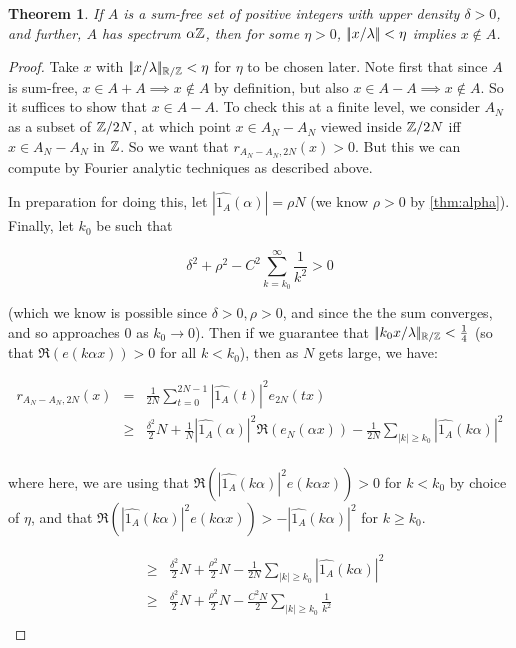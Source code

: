 \documentclass{article}
\newtheorem{theorem}{Theorem}[section]
\theoremstyle{definition}
\theoremstyle{remark}
\numberwithin{equation}{section}
\begin{document}
\begin{theorem}\label{thm:hole1}
  If $A$ is a sum-free set of positive integers with upper density
  $\delta > 0$, and further, $A$ has spectrum $\alpha\mathbb{Z}$, then for
  some $\eta > 0$, $|\!|x/\lambda|\!| < \eta$ implies $x \notin A$.
\end{theorem}

\begin{proof}
  Take $x$ with $|\!|x/\lambda|\!|_{\mathbb{R}/\mathbb{Z}} < \eta$ for $\eta$ to be chosen
  later.  Note first that since $A$ is sum-free,
  $x \in A+A \implies x \notin A$ by definition, but also
  $x \in A-A \implies x \notin A$.  So it suffices to show that
  $x \in A-A$.  To check this at a finite level, we consider $A_N$ as
  a subset of $\mathbb{Z}/2N$, at which point $x \in A_N - A_N$ viewed inside
  $\mathbb{Z}/2N$ iff $x \in A_N - A_N$ in $\mathbb{Z}$.  So we want that
  $r_{A_N-A_N,2N}(x) > 0$.  But this we can compute by Fourier
  analytic techniques as described above.

  In preparation for doing this, let
  $|\widehat{1_A}(\alpha)| = \rho N$ (we know $\rho > 0$ by
  \ref{thm:alpha}).  Finally, let $k_0$ be such that

  \[\delta^2 + \rho^2 - C^2 \sum_{k=k_0}^\infty \frac{1}{k^2} > 0\]

  (which we know is possible since $\delta > 0, \rho > 0$, and since
  the the sum converges, and so approaches 0 as $k_0 \to 0$).  Then if
  we guarantee that $|\!|k_0 x/\lambda|\!|_{\mathbb{R}/\mathbb{Z}} < \frac14$ (so that
  $\Re(e(k\alpha x)) > 0$ for all $k < k_0$), then as $N$ gets large, we
  have:

  \begin{eqnarray*}
    r_{A_N - A_N,2N}(x) &=& \frac{1}{2N} \sum_{t=0}^{2N-1} |\widehat{1_A}(t)|^2 e_{2N}(tx)\\
                        &\geq& \frac{\delta^2}{2} N + \frac{1}{N}
                               |\widehat{1_A}(\alpha)|^2
                               \Re(e_N(\alpha x)) - \frac{1}{2N} \sum_{|k| \geq k_0}
                               |\widehat{1_A}(k\alpha)|^2\\
  \end{eqnarray*}

  where here, we are using that
  $\Re(|\widehat{1_A}(k\alpha)|^2 e(k\alpha x)) > 0$ for $k < k_0$ by
  choice of $\eta$, and that
  $\Re(|\widehat{1_A}(k\alpha)|^2 e(k\alpha x)) >
  -|\widehat{1_A}(k\alpha)|^2$ for $k \geq k_0$.

  \begin{eqnarray*}
    &\geq& \frac{\delta^2}{2} N + \frac{\rho^2}{2} N
           - \frac{1}{2N} \sum_{|k| \geq k_0} |\widehat{1_A}(k\alpha)|^2\\
    &\geq& \frac{\delta^2}{2} N + \frac{\rho^2}{2} N
           - \frac{C^2 N}{2} \sum_{|k| \geq k_0}
           \frac{1}{k^2}\\
  \end{eqnarray*}



\end{proof}
\end{document}
